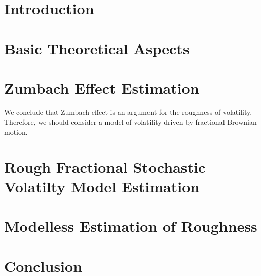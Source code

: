 


    \maketitlepage


    \begin{abstract}
        
    \end{abstract}

    \tableofcontents

    \listoffigures
    \listoftables

    

    \chapter*{Introduction}\setcounter{page}{3}

        

    \chapter{Basic Theoretical Aspects}

        

    \chapter{Zumbach Effect Estimation}

        

        

        We conclude that Zumbach effect is an argument for the roughness of volatility. Therefore, we should consider a model of volatility driven by fractional Brownian motion.

    \chapter{Rough Fractional Stochastic Volatilty Model Estimation}

        

        

    \chapter{Modelless Estimation of Roughness}

        

    \chapter*{Conclusion}

        

    \printbibliography

    
